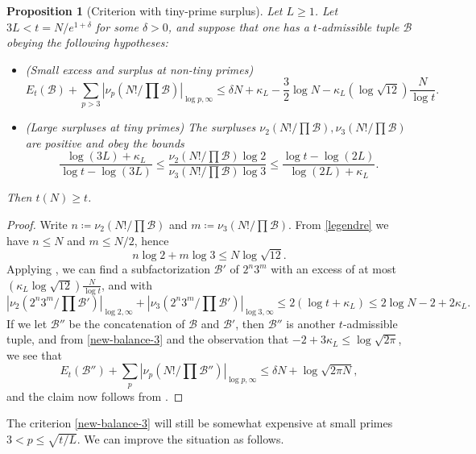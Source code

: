 \documentclass[12pt,a4paper,reqno]{amsart}
\numberwithin{equation}{section}
\theoremstyle{plain}
\newtheorem{proposition}[theorem]{Proposition}
\theoremstyle{definition}
\newcommand\tuple{{\mathcal B}}
\begin{document}
\begin{proposition}[Criterion with tiny-prime surplus]\label{balance-23}  Let $L \geq 1$.
  Let $3L < t = N/e^{1+\delta}$ for some $\delta>0$, and suppose that one has a $t$-admissible tuple $\tuple$ obeying the following hypotheses:
\begin{itemize}
  \item[(i)] (Small excess and surplus at non-tiny primes)
  \begin{equation}\label{new-balance-3}
    E_t(\tuple) + \sum_{p>3} |\nu_p(N!/\prod \tuple)|_{\log p,\infty} \leq \delta N + \kappa_L - \frac{3}{2} \log N - \kappa_L (\log \sqrt{12}) \frac{N}{\log t}.
  \end{equation}
  \item[(ii)] (Large surpluses at tiny primes)
The surpluses $\nu_2(N!/\prod \tuple), \nu_3(N!/\prod \tuple)$ are positive and obey the bounds
$$
\frac{\log(3L)+\kappa_L}{\log t - \log(3L)} \leq \frac{\nu_2(N!/\prod \tuple) \log 2}{\nu_3(N!/\prod \tuple) \log 3} \leq \frac{\log t - \log(2L)}{\log(2L)+\kappa_L}.
$$
\end{itemize}
Then $t(N) \geq t$.
\end{proposition}
  

\begin{proof} Write $n \coloneqq \nu_2(N!/\prod \tuple)$ and $m \coloneqq \nu_3(N!/\prod \tuple)$.  From \eqref{legendre} we have $n \leq N$ and $m \leq N/2$, hence
  $$ n \log 2 + m \log 3 \leq N \log \sqrt{12}.$$
Applying , we can find a subfactorization $\tuple'$ of $2^n 3^m$ with an excess of at most $(\kappa_L \log \sqrt{12}) \frac{N}{\log t}$, and with
$$ |\nu_2(2^n 3^m/\prod \tuple')|_{\log 2,\infty}
+ |\nu_3(2^n 3^m/\prod \tuple')|_{\log 3,\infty}
 \leq 2(\log t + \kappa_L) \leq 2 \log N - 2 + 2 \kappa_L.$$
 If we let $\tuple''$ be the concatenation of $\tuple$ and $\tuple'$, then $\tuple''$ is another $t$-admissible tuple, and from \eqref{new-balance-3} and the observation that $-2+3\kappa_L \leq \log \sqrt{2\pi}$, we see that
 $$
 E_t(\tuple'') + \sum_{p} |\nu_p(N!/\prod \tuple'')|_{\log p,\infty} \leq \delta N + \log \sqrt{2\pi N},$$
 and the claim now follows from .
\end{proof}

The criterion \eqref{new-balance-3} will still be somewhat expensive at small primes $3 < p \leq \sqrt{t/L}$.  We can improve the situation as follows.
\end{document}
